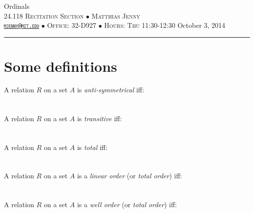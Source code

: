 \documentclass[justified]{tufte-handout}
\newcommand{\HRule}{\rule{\linewidth}{0.1mm}}
\begin{document}
\begin{fullwidth}
\noindent\LARGE Ordinals  \normalsize \\[.3cm]
\noindent  \textsc{24.118 Recitation Section $\bullet$ Matthias Jenny\\  {\texttt{\href{mailto:mjenny@mit.edu}{mjenny@mit.edu}}} $\bullet$ Office:  32-D927 $\bullet$ Hours: Thu 11:30-12:30} \hfill{October 3, 2014}
\noindent\HRule
\end{fullwidth}

\section{Some definitions}

\noindent A relation $R$ on a set $A$ is \emph{anti-symmetrical} iff: \underline{\hspace{9.95cm}}\\\\\underline{\hspace{16.88cm}}\\

\noindent A relation $R$ on a set $A$ is \emph{transitive} iff: \underline{\hspace{11cm}}\\\\\underline{\hspace{16.88cm}}\\

\noindent A relation $R$ on a set $A$ is \emph{total} iff: \underline{\hspace{11.7cm}}\\\\\underline{\hspace{16.88cm}}\\

\noindent A relation $R$ on a set $A$ is a \emph{linear order} (or \emph{total order}) iff: \underline{\hspace{8.3cm}}\\\\\underline{\hspace{16.88cm}}\\

\noindent A relation $R$ on a set $A$ is a \emph{well order} (or \emph{total order}) iff: \underline{\hspace{8.5cm}}\\\\\underline{\hspace{16.88cm}}\\
\end{document}
